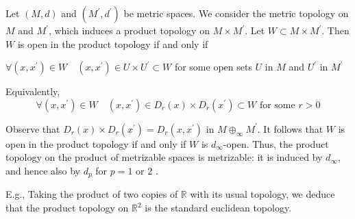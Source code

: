 \documentclass[a4paper]{article}
\begin{document}
\begin{example}
    Let $(M, d)$ and $\left(M^{\prime}, d^{\prime}\right)$ be metric spaces. We consider the metric topology on $M$ and $M^{\prime}$, which induces a product topology on $M \times M^{\prime}$. Let $W \subset M \times M^{\prime}$. Then $W$ is open in the product topology if and only if
    \begin{center}
        $\forall\left(x, x^{\prime}\right) \in W \quad\left(x, x^{\prime}\right) \in U \times U^{\prime} \subset W$ for some open sets $U$ in $M$ and $U^{\prime}$ in $M^{\prime}$
    \end{center}
    Equivalently,
    $$
    \forall\left(x, x^{\prime}\right) \in W \quad\left(x, x^{\prime}\right) \in D_{r}(x) \times D_{r}\left(x^{\prime}\right) \subset W \text { for some } r>0
    $$

    Observe that $D_{r}(x) \times D_{r}\left(x^{\prime}\right)=D_{r}\left(x, x^{\prime}\right)$ in $M \oplus_{\infty} M^{\prime}$. It follows that $W$ is open in the product topology if and only if $W$ is $d_{\infty}$-open. Thus, the product topology on the product of metrizable spaces is metrizable: it is induced by $d_{\infty}$, and hence also by $d_{p}$ for $p=1$ or 2 .

    E.g., Taking the product of two copies of $\mathbb{R}$ with its usual topology, we deduce that the product topology on $\mathbb{R}^{2}$ is the standard euclidean topology.
\end{example}
\end{document}
